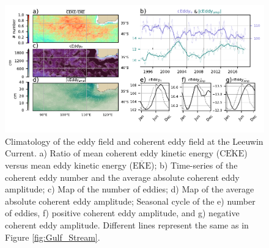 \documentclass[draft,linenumbers]{agujournal2019}
\newcommand{\MEKE}{\overline{\textrm{EKE}}}
\newcommand{\EKE}{\textrm{EKE}}
\newcommand{\MCEKE}{\overline{\textrm{CEKE}}}
\begin{document}
	
	\begin{figure}
	    \centering
	    \includegraphics[width=1\textwidth]{figures/regional_ratios_and_stats_V3_0.pdf}
	    \caption{Climatology of the eddy field and coherent eddy field at the Leeuwin Current. a) Ratio of mean coherent eddy kinetic energy ($\MCEKE$) versus mean eddy kinetic energy ($\MEKE$); b) Time-series of the coherent eddy number and the average absolute coherent eddy amplitude; c) Map of the number of eddies; d) Map of the average absolute coherent eddy amplitude; Seasonal cycle of the e) number of eddies, f) positive coherent eddy amplitude, and g) negative coherent eddy amplitude. Different lines represent the same as in Figure \ref{fig:Gulf_Stream}.}
	    \label{fig:leeuwin_cycle}
	\end{figure}
\end{document}
